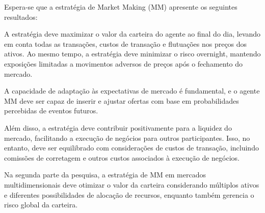 
Espera-se que a estratégia de Market Making (MM) apresente os seguintes resultados:

A estratégia deve maximizar o valor da carteira do agente ao final do dia, levando em conta todas as transações, custos de transação e flutuações nos preços dos ativos. Ao mesmo tempo, a estratégia deve minimizar o risco overnight, mantendo exposições limitadas a movimentos adversos de preços após o fechamento do mercado.

A capacidade de adaptação às expectativas de mercado é fundamental, e o agente MM deve ser capaz de inserir e ajustar ofertas com base em probabilidades percebidas de eventos futuros.

Além disso, a estratégia deve contribuir positivamente para a liquidez do mercado, facilitando a execução de negócios para outros participantes. Isso, no entanto, deve ser equilibrado com considerações de custos de transação, incluindo comissões de corretagem e outros custos associados à execução de negócios.

Na segunda parte da pesquisa, a estratégia de MM em mercados multidimensionais deve otimizar o valor da carteira considerando múltiplos ativos e diferentes possibilidades de alocação de recursos, enquanto também gerencia o risco global da carteira.

